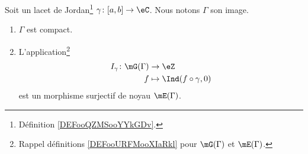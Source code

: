 \begin{lemma}     \label{LEMooBZUCooHWfolf}
	Soit un lacet de Jordan\footnote{Définition \ref{DEFooQZMSooYYkGDv}.} \( \gamma\colon \mathopen[ a , b \mathclose]\to \eC\). Nous notons \( \Gamma\) son image.
	\begin{enumerate}
		\item
		      \( \Gamma\) est compact.
		\item
		      L'application\footnote{Rappel définitions \ref{DEFooURFMooXIaRkl} pour \( \mG(\Gamma)\) et \( \mE(\Gamma)\).}
		      \begin{equation}
			      \begin{aligned}
				      I_{\gamma}\colon \mG(\Gamma) & \to \eZ                        \\
				      f                            & \mapsto \Ind(f\circ \gamma, 0)
			      \end{aligned}
		      \end{equation}
		      est un morphisme surjectif de noyau \( \mE(\Gamma)\).
	\end{enumerate}
\end{lemma}

